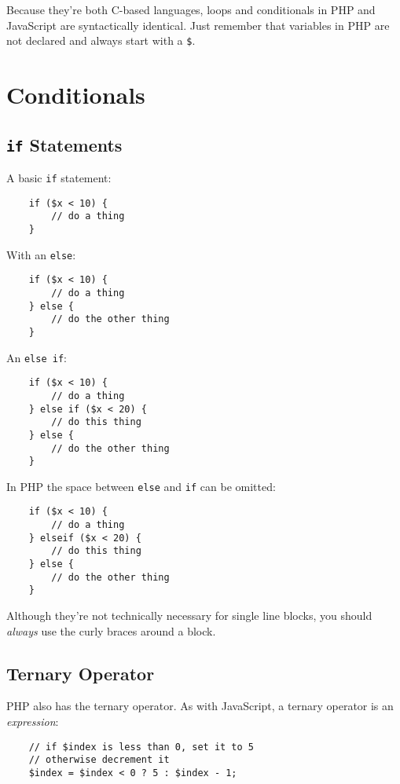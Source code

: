 Because they're both C-based languages, loops and conditionals in PHP and JavaScript are syntactically identical. Just remember that variables in PHP are not declared and always start with a \texttt{\$}.

\section{Conditionals}

\subsection{\texttt{if} Statements}

A basic \texttt{if} statement:

\begin{verbatim}
    if ($x < 10) {
        // do a thing
    }
\end{verbatim}

With an \texttt{else}:

\begin{verbatim}
    if ($x < 10) {
        // do a thing
    } else {
        // do the other thing
    }
\end{verbatim}

An \texttt{else if}:

\begin{verbatim}
    if ($x < 10) {
        // do a thing
    } else if ($x < 20) {
        // do this thing
    } else {
        // do the other thing
    }
\end{verbatim}

In PHP the space between \texttt{else} and \texttt{if} can be omitted:

\begin{verbatim}
    if ($x < 10) {
        // do a thing
    } elseif ($x < 20) {
        // do this thing
    } else {
        // do the other thing
    }
\end{verbatim}

Although they're not technically necessary for single line blocks, you should \textit{always} use the curly braces around a block.


\subsection{Ternary Operator}

PHP also has the ternary operator. As with JavaScript, a ternary operator is an \textit{expression}:

\begin{verbatim}
    // if $index is less than 0, set it to 5
    // otherwise decrement it
    $index = $index < 0 ? 5 : $index - 1;
\end{verbatim}

